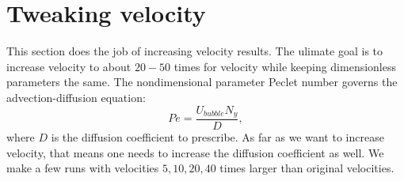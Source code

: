 \documentclass{article}
\newcommand{\beq}{\begin{equation}}
\newcommand{\feq}{\end{equation}}
\begin{document}
\section{Tweaking velocity}
This section does the job of increasing velocity results. The ulimate goal is to increase velocity
to about $20-50$ times for velocity while keeping dimensionless parameters the same. The
nondimensional parameter Peclet number governs the advection-diffusion equation:
\beq
Pe=\frac{U_{bubble} N_y}{D},
\feq
where $D$ is the diffusion coefficient to prescribe. As far as we want to increase velocity, that
means one needs to increase the diffusion coefficient as well. We make a few runs with velocities
$5,10,20,40$ times larger than original velocities. 




\end{document}
